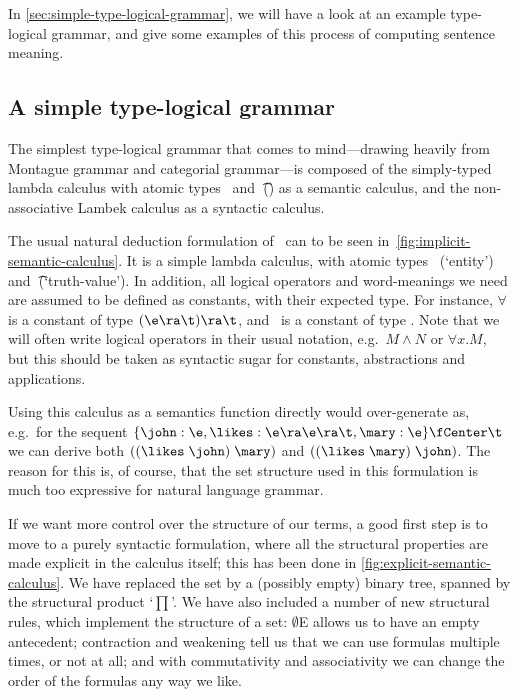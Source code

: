 In \autoref{sec:simple-type-logical-grammar}, we will have a look at
an example type-logical grammar, and give some examples of this
process of computing sentence meaning.



\subsection{A simple type-logical grammar}
\label{sec:simple-type-logical-grammar}

The simplest type-logical grammar that comes to mind---drawing
heavily from Montague grammar and categorial grammar---is composed of
the simply-typed lambda calculus with atomic types \e\ and \t\ (\lamET) as
a semantic calculus, and the non-associative Lambek calculus
\citep[NL;][]{lambek1961} as a syntactic calculus.

The usual natural deduction formulation of \lamET\ can to be seen
in~\autoref{fig:implicit-semantic-calculus}. It is a simple lambda
calculus, with atomic types \e\ (`entity') and \t\ (`truth-value'). In
addition, all logical operators and word-meanings we need are assumed
to be defined as constants, with their expected type. For instance,
$\forall$ is a constant of type $(\e\ra\t)\ra\t$, and \john\ is a
constant of type \e. Note that we will often write logical operators
in their usual notation, e.g.\ $M\land N$ or $\forall x.M$, but this
should be taken as syntactic sugar for constants, abstractions and
applications.

%

Using this calculus as a semantics function directly would
over-generate as, e.g.\ for the sequent $\{\john:\e,
\likes:\e\ra\e\ra\t, \mary:\e\}\fCenter\t$ we can derive
both $((\likes\;\john)\;\mary)$ and $((\likes\;\mary)\;\john)$.
The reason for this is, of course, that the set structure used in this
formulation is much too expressive for natural language grammar.

If we want more control over the structure of our terms, a good first
step is to move to a purely syntactic formulation, where all the
structural properties are made explicit in the calculus itself; this
has been done in \autoref{fig:explicit-semantic-calculus}. We have
replaced the set by a (possibly empty) binary tree, spanned by the
structural product `$\prod$'. We have also included a number of new
structural rules, which implement the structure of a set: $\emptyset$E
allows us to have an empty antecedent; contraction and weakening tell
us that we can use formulas multiple times, or not at all; and with
commutativity and associativity we can change the order of the
formulas any way we like.

